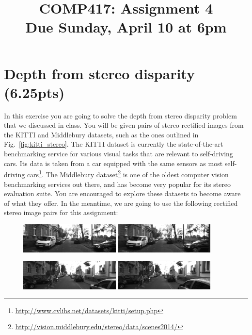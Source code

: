 \documentclass[a4paper,10pt]{article}
\title{COMP417: Assignment 4\\Due Sunday, April 10  at 6pm}
\author{}
\begin{document}
\maketitle


\section{Depth from stereo disparity (6.25pts)}
In this exercise you are going to solve the depth from stereo disparity problem that we discussed in class. You will be given pairs of stereo-rectified images from the 
KITTI and Middlebury datasets, such as the ones outlined in Fig.~\ref{fig:kitti_stereo}. The KITTI dataset is currently the state-of-the-art benchmarking service for various 
visual tasks that are relevant to self-driving cars. Its data is taken from a car equipped with the same sensors as most self-driving cars\footnote{\url{http://www.cvlibs.net/datasets/kitti/setup.php}}.
The Middlebury dataset\footnote{\url{http://vision.middlebury.edu/stereo/data/scenes2014/}} is one of the oldest computer vision benchmarking services out there, and has become
very popular for its stereo evaluation suite. You are encouraged to explore these datasets to become aware of what they offer. In the meantime, we are going to use the following rectified stereo 
image pairs for this assignment:
\begin{figure}[h!]
  \begin{center}
    \includegraphics[width=0.45\textwidth]{stereo_images/images0/kitti_1_left}
    \includegraphics[width=0.45\textwidth]{stereo_images/images1/kitti_1_right}
  \end{center}
\end{figure}  

\begin{figure}[h!]
  \begin{center}  
    \includegraphics[width=0.45\textwidth]{stereo_images/images0/kitti_2_left}
    \includegraphics[width=0.45\textwidth]{stereo_images/images1/kitti_2_right}
\end{center}
\end{figure}  
    
\end{document}
